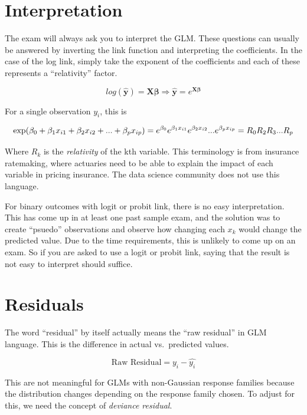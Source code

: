 \documentclass[openany]{book}
\begin{document}
\hypertarget{interpretation}{%
\section{Interpretation}\label{interpretation}}

The exam will always ask you to interpret the GLM. These questions can usually be answered by inverting the link function and interpreting the coefficients. In the case of the log link, simply take the exponent of the coefficients and each of these represents a ``relativity'' factor.

\[
log(\mathbf{\hat{y}}) = \mathbf{X} \mathbf{\beta} \Rightarrow \mathbf{\hat{y}} = e^{\mathbf{X} \mathbf{\beta}}
\]

For a single observation \(y_i\), this is

\[
\text{exp}(\beta_0 + \beta_1 x_{i1} + \beta_2 x_{i2} + ... + \beta_p x_{ip}) = \\
e^{\beta_0} e^{\beta_1 x_{i1}}e^{\beta_2 x_{i2}} ...  e^{\beta_p x_{ip}} = 
R_0 R_2 R_3 ... R_{p}
\]

Where \(R_k\) is the \emph{relativity} of the kth variable. This terminology is from insurance ratemaking, where actuaries need to be able to explain the impact of each variable in pricing insurance. The data science community does not use this language.

For binary outcomes with logit or probit link, there is no easy interpretation. This has come up in at least one past sample exam, and the solution was to create ``psuedo'' observations and observe how changing each \(x_k\) would change the predicted value. Due to the time requirements, this is unlikely to come up on an exam. So if you are asked to use a logit or probit link, saying that the result is not easy to interpret should suffice.

\hypertarget{residuals}{%
\section{Residuals}\label{residuals}}

The word ``residual'' by itself actually means the ``raw residual'' in GLM language. This is the difference in actual vs.~predicted values.

\[\text{Raw Residual} = y_i - \hat{y_i}\]

This are not meaningful for GLMs with non-Gaussian response families because the distribution changes depending on the response family chosen. To adjust for this, we need the concept of \emph{deviance residual}.
\end{document}
